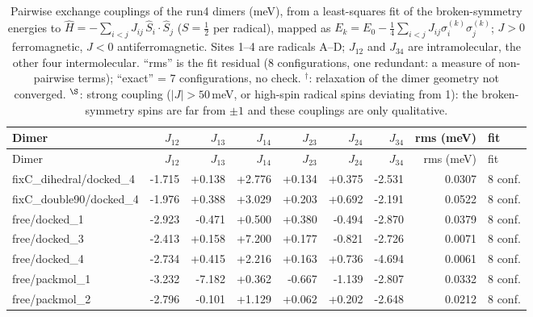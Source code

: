 
\begin{longtable}{@{}lrrrrrrrl@{}}
\caption{Pairwise exchange couplings of the run4 dimers (meV), from a least-squares fit of the
         broken-symmetry energies to $\hat H = -\sum_{i<j} J_{ij}\,\hat S_i\cdot\hat S_j$ ($S=\tfrac12$ per
         radical), mapped as $E_k=E_0-\tfrac14\sum_{i<j}J_{ij}\sigma_i^{(k)}\sigma_j^{(k)}$; $J>0$ ferromagnetic,
         $J<0$ antiferromagnetic. Sites 1--4 are radicals A--D; $J_{12}$ and $J_{34}$ are intramolecular,
         the other four intermolecular. ``rms'' is the fit residual (8 configurations, one
         redundant: a measure of non-pairwise terms); ``exact'' = 7 configurations, no check.
         $^{\dagger}$: relaxation of the dimer geometry not converged. $^{\S}$: strong coupling
         ($|J|>50$\,meV, or high-spin radical spins deviating from 1): the broken-symmetry
         spins are far from $\pm1$ and these couplings are only qualitative.}\label{tab:run4_exchange}\\
\toprule
Dimer & $J_{12}$ & $J_{13}$ & $J_{14}$ & $J_{23}$ & $J_{24}$ & $J_{34}$ & rms (meV) & fit \\
\midrule
\endfirsthead
\toprule
Dimer & $J_{12}$ & $J_{13}$ & $J_{14}$ & $J_{23}$ & $J_{24}$ & $J_{34}$ & rms (meV) & fit \\
\midrule
\endhead
\bottomrule
\endlastfoot
fixC\_dihedral/docked\_4 & -1.715 & +0.138 & +2.776 & +0.134 & +0.375 & -2.531 & 0.0307 & 8 conf. \\
fixC\_double90/docked\_4 & -1.976 & +0.388 & +3.029 & +0.203 & +0.692 & -2.191 & 0.0522 & 8 conf. \\
free/docked\_1 & -2.923 & -0.471 & +0.500 & +0.380 & -0.494 & -2.870 & 0.0379 & 8 conf. \\
free/docked\_3 & -2.413 & +0.158 & +7.200 & +0.177 & -0.821 & -2.726 & 0.0071 & 8 conf. \\
free/docked\_4 & -2.734 & +0.415 & +2.216 & +0.163 & +0.736 & -4.694 & 0.0061 & 8 conf. \\
free/packmol\_1 & -3.232 & -7.182 & +0.362 & -0.667 & -1.139 & -2.807 & 0.0332 & 8 conf. \\
free/packmol\_2 & -2.796 & -0.101 & +1.129 & +0.062 & +0.202 & -2.648 & 0.0212 & 8 conf. \\
\end{longtable}
